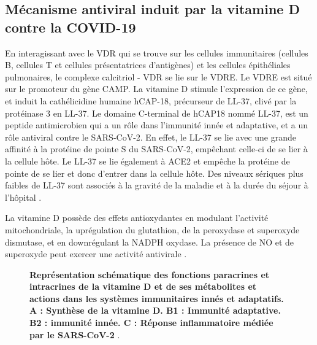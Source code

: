 \documentclass[
  a4paper,
  DIV=11,
  numbers=noendperiod,
  listof=totoc]{scrreprt}
\begin{document}
\subsection{Mécanisme antiviral induit par la vitamine D contre la
COVID-19}\label{muxe9canisme-antiviral-induit-par-la-vitamine-d-contre-la-covid-19}

En interagissant avec le \ac{VDR} qui se trouve sur les cellules
immunitaires (cellules B, cellules T et cellules présentatrices
d'antigènes) et les cellules épithéliales pulmonaires, le complexe
calcitriol - \ac{VDR} se lie sur le \ac{VDRE}. Le \ac{VDRE} est situé
sur le promoteur du gène CAMP. La vitamine D stimule l'expression de ce
gène, et induit la cathélicidine humaine hCAP-18, précurseur de LL-37,
clivé par la protéinase 3 en LL-37. Le domaine C-terminal de hCAP18
nommé LL-37, est un peptide antimicrobien qui a un rôle dans l'immunité
innée et adaptative, et a un rôle antiviral contre le SARS-CoV-2. En
effet, le LL-37 se lie avec une grande affinité à la protéine de pointe
S du SARS-CoV-2, empêchant celle-ci de se lier à la cellule hôte. Le
LL-37 se lie également à ACE2 et empêche la protéine de pointe de se
lier et donc d'entrer dans la cellule hôte. Des niveaux sériques plus
faibles de LL-37 sont associés à la gravité de la maladie et à la durée
du séjour à l'hôpital \autocites[ ]{Keutmann.2022}[
]{Cutuli.2024}{Shiravi.2022,Munshi.2021}.

La vitamine D possède des effets antioxydantes en modulant l'activité
mitochondriale, la uprégulation du glutathion, de la peroxydase et
superoxyde dismutase, et en downrégulant la NADPH oxydase. La présence
de NO et de superoxyde peut exercer une activité antivirale \autocites[
]{Shiravi.2022}{Contreras-Bolívar.2023}.

\begin{figure}


\caption[\textbf{Représentation schématique des fonctions paracrines et
intracrines de la vitamine D et de ses métabolites et actions dans les
systèmes immunitaires innés et adaptatifs. A : Synthèse de la vitamine
D. B1 : Immunité adaptative. B2 : immunité innée. C : Réponse
inflammatoire médiée par le
SARS-CoV-2}]{\label{fig-vd-covid-function}\textbf{Représentation
schématique des fonctions paracrines et intracrines de la vitamine D et
de ses métabolites et actions dans les systèmes immunitaires innés et
adaptatifs. A : Synthèse de la vitamine D. B1 : Immunité adaptative. B2
: immunité innée. C : Réponse inflammatoire médiée par le SARS-CoV-2}
\autocite{Contreras-Bolívar.2023}.}

\end{figure}%
\end{document}
